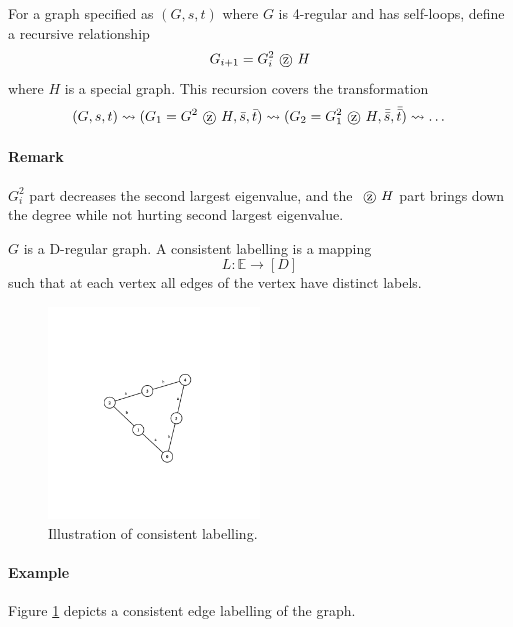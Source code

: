 \begin{algorithm}[Reingold, 2005]
	For a graph specified as $(G, s, t)$ where $G$ is 4-regular and has self-loops, define a recursive relationship 
	\begin{equation}
		G_{i + 1} = G_i ^2 \tcircle{z} H
	\end{equation}
	where $H$ is a special graph. This recursion covers the transformation
	\begin{equation}
		(G, s, t) \leadsto (G_1 = G^2 \tcircle{z} H, \bar s, \bar t) \leadsto (G_2 = G_1^2 \tcircle{z} H, \bar{\bar{s}}, \bar{\bar{t}} ) \leadsto \dots
	\end{equation}
	
	\paragraph{Remark} $G_i^2$ part decreases the second largest eigenvalue, and the $\tcircle{z} H$ part brings down the degree while not hurting second largest eigenvalue. 
\end{algorithm}

\begin{definition}
	$G$ is a D-regular graph. A consistent labelling is a mapping 
	\begin{equation}
		L: \mathbb E \rightarrow [D]
	\end{equation}
	such that at each vertex all edges of the vertex have distinct labels. 
\end{definition}


\begin{figure}
	\centering
	\includegraphics[width=0.5\textwidth]{figs/consistentlabelling-1.png}
	\caption{Illustration of consistent labelling.\label{fig:consistent-labeling-1}}
\end{figure}


\paragraph{Example} Figure \ref{fig:consistent-labeling-1} depicts a consistent edge labelling of the graph. 

